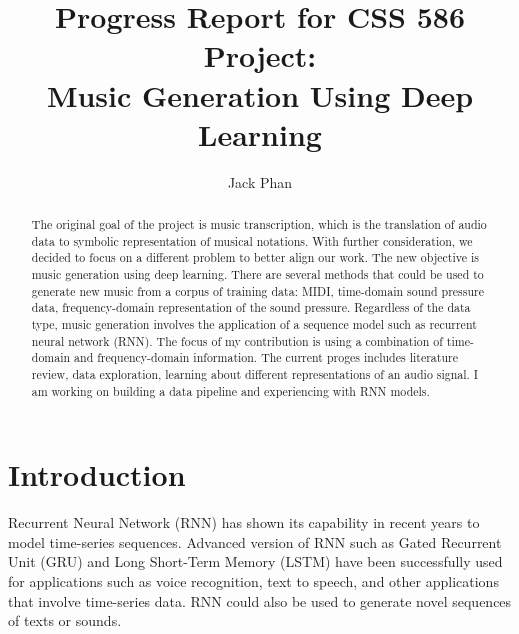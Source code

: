 \documentclass[sigconf,authorversion]{acmart}
\begin{document}
\renewcommand\footnotetextcopyrightpermission[1]{}
\pagestyle{plain}
\title{Progress Report for CSS 586 Project: \\
Music Generation Using Deep Learning}


\author{Jack Phan}

\begin{abstract}

The original goal of the project is music transcription, which is the translation of audio data
to symbolic representation of musical notations. With further consideration, we decided to focus on 
a different problem to better align our work. The new objective is music generation using deep learning.
There are several methods that could be used to generate new music from a corpus of training data: MIDI, 
time-domain sound pressure data, frequency-domain representation of the sound pressure. Regardless of the 
data type, music generation involves the application of a sequence model such as recurrent neural network 
(RNN). The focus of my contribution is using a combination of time-domain and frequency-domain information. 
The current proges includes literature review, data exploration, learning about different representations 
of an audio signal. I am working on building a data pipeline and experiencing with RNN models.
\end{abstract}


\maketitle

\section{Introduction}

Recurrent Neural Network (RNN) has shown its capability in recent years to model time-series sequences. 
Advanced version of RNN such as Gated Recurrent Unit (GRU) and Long Short-Term Memory (LSTM) have been 
successfully used for applications such as voice recognition, text to speech, and other applications 
that involve time-series data. RNN could also be used to generate novel sequences of texts or sounds.
\end{document}
